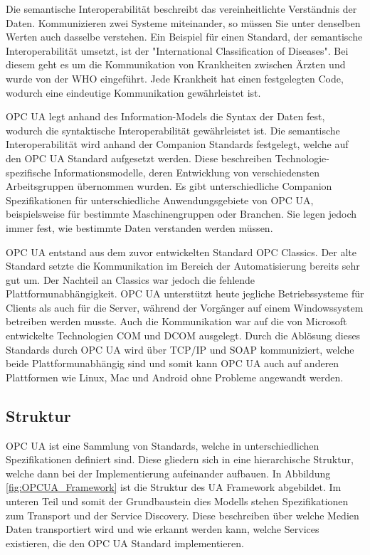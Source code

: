 \documentclass[a4paper, 12pt, oneside, toc=listofnumbered, bibliography=totoc]{scrbook}
\begin{document}
	 Die semantische Interoperabilität beschreibt das vereinheitlichte Verständnis der Daten. Kommunizieren zwei Systeme miteinander, so müssen Sie unter denselben Werten auch dasselbe verstehen. Ein Beispiel für einen Standard, der semantische Interoperabilität umsetzt, ist der "International Classification of Diseases". Bei diesem geht es um die Kommunikation von Krankheiten zwischen Ärzten und wurde von der WHO eingeführt. Jede Krankheit hat einen festgelegten Code, wodurch eine eindeutige Kommunikation gewährleistet ist. \cite{mielebacher_verteilte_2021-1}
	 
  	 OPC UA legt anhand des Information-Models die Syntax der Daten fest, wodurch die syntaktische Interoperabilität gewährleistet ist. Die semantische Interoperabilität wird anhand der Companion Standards festgelegt, welche auf den OPC UA Standard aufgesetzt werden. Diese beschreiben Technologie-spezifische Informationsmodelle, deren Entwicklung von verschiedensten Arbeitsgruppen übernommen wurden. Es gibt unterschiedliche Companion Spezifikationen für unterschiedliche Anwendungsgebiete von OPC UA, beispielsweise für bestimmte Maschinengruppen oder Branchen. Sie legen jedoch immer fest, wie bestimmte Daten verstanden werden müssen. \cite{noauthor_machinery_nodate-1}
	 
	 OPC UA entstand aus dem zuvor entwickelten Standard OPC Classics. Der alte Standard setzte die Kommunikation im Bereich der Automatisierung bereits sehr gut um. Der Nachteil an Classics war jedoch die fehlende Plattformunabhängigkeit. OPC UA unterstützt heute jegliche Betriebssysteme für Clients als auch für die Server, während der Vorgänger auf einem Windowssystem betreiben werden musste. Auch die Kommunikation war auf die von Microsoft entwickelte Technologien \ac{COM} und \ac{DCOM} ausgelegt. Durch die Ablösung dieses Standards durch OPC UA wird über TCP/IP und SOAP kommuniziert, welche beide Plattformunabhängig sind und somit kann OPC UA auch auf anderen Plattformen wie Linux, Mac und Android ohne Probleme angewandt werden. \cite{mielebacher_verteilte_2021-1}
	
		\subsection{Struktur}
		
		OPC UA ist eine Sammlung von Standards, welche in unterschiedlichen Spezifikationen definiert sind. Diese gliedern sich in eine hierarchische Struktur, welche dann bei der Implementierung aufeinander aufbauen. In Abbildung \ref{fig:OPCUA_Framework} ist die Struktur des UA Framework abgebildet. Im unteren Teil und somit der Grundbaustein dies Modells stehen Spezifikationen zum Transport und der Service Discovery. Diese beschreiben über welche Medien Daten transportiert wird und wie erkannt werden kann, welche Services existieren, die den OPC UA Standard implementieren. \cite{mahnke_opc_2009, rinke_was_2022}
		
\end{document}
